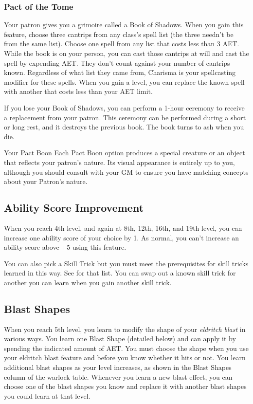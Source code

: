\subsubsection{Pact of the Tome}

Your patron gives you a grimoire called a Book of Shadows. When you gain this feature, choose three cantrips from any class's spell list (the three needn't be from the same list). Choose one spell from any list that costs less than 3 AET. While the book is on your person, you can cast those cantrips at will and cast the spell by expending AET. They don't count against your number of cantrips known. Regardless of what list they came from, Charisma is your spellcasting modifier for these spells. When you gain a level, you can replace the known spell with another that costs less than your AET limit.

If you lose your Book of Shadows, you can perform a 1-hour ceremony to receive a replacement from your patron. This ceremony can be performed during a short or long rest, and it destroys the previous book. The book turns to ash when you die.

\begin{DndComment}{Your Pact Boon}
	Each Pact Boon option produces a special creature or an object that reflects your patron's nature. Its visual appearance is entirely up to you, although you should consult with your GM to ensure you have matching concepts about your Patron's nature.
\end{DndComment}

\subsection{Ability Score Improvement}

When you reach 4th level, and again at 8th, 12th, 16th, and 19th level, you can increase one ability score of your choice by 1.  As normal, you can't increase an ability score above +5 using this feature.

You can also pick a Skill Trick but you must meet the prerequisites for skill tricks learned in this way. See  for that list. You can swap out a known skill trick for another you can learn when you gain another skill trick.

\subsection{Blast Shapes}

When you reach 5th level, you learn to modify the shape of your \textit{eldritch blast} in various ways. You learn one Blast Shape (detailed below) and can apply it by spending the indicated amount of AET. You must choose the shape when you use your eldritch blast feature and before you know whether it hits or not. You learn additional blast shapes as your level increases, as shown in the Blast Shapes column of the warlock table. Whenever you learn a new blast effect, you can choose one of the blast shapes you know and replace it with another blast shapes you could learn at that level.


